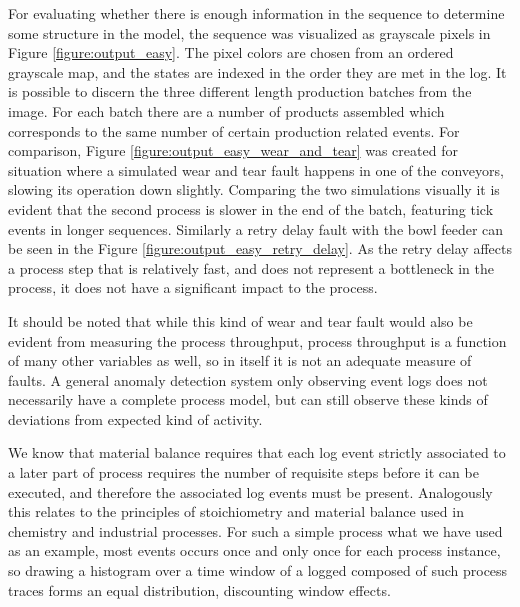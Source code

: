 \documentclass[procedia]{easychair}
\begin{document}
For evaluating whether there is enough information in the sequence to determine some structure in the model, the sequence was visualized as grayscale pixels in Figure \ref{figure:output_easy}.
The pixel colors are chosen
from an ordered grayscale map, and the states are indexed in the order they are met in the log. It is possible to discern the three different length production batches from the image.
For each batch there are
a number of products assembled which corresponds to the same number of certain production related events.
For comparison, Figure \ref{figure:output_easy_wear_and_tear} was
created for situation where a simulated wear and tear fault happens in one of the conveyors, slowing its operation down slightly. Comparing the two simulations visually it is evident that the second process
is slower in the end of the batch, featuring tick events in longer sequences.
Similarly a retry delay fault with the bowl feeder can be seen in the Figure \ref{figure:output_easy_retry_delay}. As the retry delay affects a process step that is relatively fast, and does not 
represent a bottleneck in the process, it does not have a significant impact to the process.

It should be noted that while this kind of wear and tear fault would also be evident from measuring the process throughput, process throughput is a function of many other variables as well,
so in itself it is not an adequate measure of faults. A general anomaly detection system only observing event logs does not necessarily have a complete process model, but
can still observe these kinds of deviations from expected kind of activity.

We know that material balance requires that each log event strictly associated to a later part of process requires the number of requisite steps before it can be executed, and
therefore the associated log events must be present. Analogously this relates to the principles of stoichiometry and material balance used in chemistry and industrial processes.
For such a simple process what we have used as an example, most events occurs once and only once for each process instance, so drawing a histogram over a time window of a logged
composed of such process traces forms an equal distribution, discounting window effects.
\end{document}
